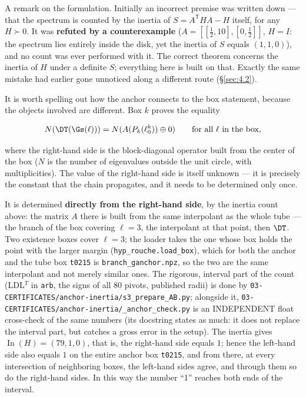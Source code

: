 A remark on the formulation. Initially an incorrect premise was written
down --- that the spectrum is counted by the inertia of $S = A^{\mathsf{T}}HA - H$
itself, for any $H \succ 0$. It was \textbf{refuted by a counterexample}
($A = [[\tfrac{1}{2}, 10], [0, \tfrac{1}{2}]]$, $H = I$: the spectrum lies entirely inside the
disk, yet the inertia of $S$ equals $(1,1,0)$), and no count was ever
performed with it. The correct theorem concerns the inertia of $H$ under a
definite $S$; everything here is built on that. Exactly the same mistake
had earlier gone unnoticed along a different route (\S\ref{sec:4.2}).

It is worth spelling out how the anchor connects to the box statement,
because the objects involved are different. Box $k$ proves the equality

\[
N(\DT(\Gs(\ell))) = N(A(P_{k}(\ell_{0}^{k})) \oplus 0) \qquad \text{for all } \ell \text{ in the box},
\]

where the right-hand side is the block-diagonal operator built from the
center of the box ($N$ is the number of eigenvalues outside the unit
circle, with multiplicities). The value of the right-hand side is itself
unknown --- it is precisely the constant that the chain propagates, and it
needs to be determined only once.

It is determined \textbf{directly from the right-hand side}, by the inertia
count above: the matrix $A$ there is built from the same interpolant as
the whole tube --- the branch of the box covering $\ell = 3$, the interpolant
at that point, then $\DT$. Two existence boxes cover $\ell = 3$; the loader
takes the one whose box holds the point with the larger margin
(\texttt{hyp\_\allowbreak rouche.load\_\allowbreak box}), which for both the
anchor and the tube box \texttt{t0215} is
\texttt{branch\_\allowbreak ganchor.npz}, so the two are the same interpolant
and not merely similar ones. The rigorous, interval part of the count
(LDL$^T$ in \texttt{arb}, the signs of all 80 pivots, published radii) is done by
\texttt{03-\allowbreak CERTIFICATES/\allowbreak anchor-\allowbreak inertia/\allowbreak s3\_\allowbreak prepare\_\allowbreak AB.py}; alongside it,
\texttt{03-\allowbreak CERTIFICATES/\allowbreak anchor-\allowbreak inertia/\allowbreak \_\allowbreak anchor\_\allowbreak check.py} is an INDEPENDENT float
cross-check of the same numbers (its docstring states as much: it does not
replace the interval part, but catches a gross error in the setup).
The inertia gives $\operatorname{In}(H) = (79, 1, 0)$, that is, the right-hand side equals
$1$; hence the left-hand side also equals $1$ on the entire anchor box
\texttt{t0215}, and from there, at every intersection of neighboring boxes, the
left-hand sides agree, and through them so do the right-hand sides. In this
way the number ``1'' reaches both ends of the interval.

